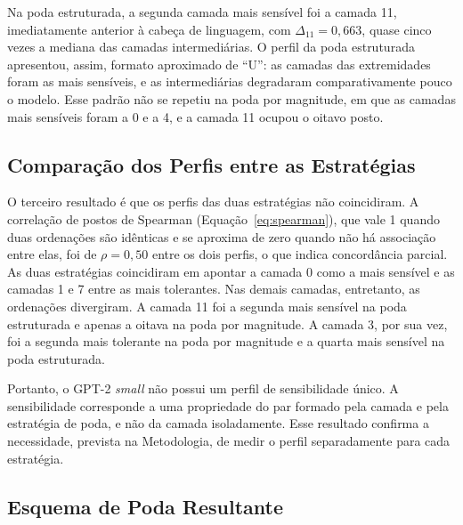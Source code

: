 Na poda estruturada, a segunda camada mais sensível foi a camada 11, imediatamente anterior à
cabeça de linguagem, com $\Delta_{11} = 0{,}663$, quase cinco vezes a mediana das camadas
intermediárias. O perfil da poda estruturada apresentou, assim, formato aproximado de ``U'': as
camadas das extremidades foram as mais sensíveis, e as intermediárias degradaram
comparativamente pouco o modelo. Esse padrão não se repetiu na poda por magnitude, em que as
camadas mais sensíveis foram a 0 e a 4, e a camada 11 ocupou o oitavo posto.

\subsection{Comparação dos Perfis entre as Estratégias}\label{subsec:perfis_divergem}

O terceiro resultado é que os perfis das duas estratégias não coincidiram. A correlação de
postos de Spearman (Equação~\ref{eq:spearman}), que vale 1 quando duas ordenações são
idênticas e se aproxima de zero quando não há associação entre elas, foi de $\rho = 0{,}50$
entre os dois perfis, o que indica concordância parcial. As
duas estratégias coincidiram em apontar a camada 0 como a mais sensível e as camadas 1 e 7
entre as mais tolerantes. Nas demais camadas, entretanto, as ordenações divergiram. A camada 11
foi a segunda mais sensível na poda estruturada e apenas a oitava na poda por magnitude. A
camada 3, por sua vez, foi a segunda mais tolerante na poda por magnitude e a quarta mais
sensível na poda estruturada.

Portanto, o GPT-2 \textit{small} não possui um perfil de sensibilidade único. A sensibilidade
corresponde a uma propriedade do par formado pela camada e pela estratégia de poda, e não da
camada isoladamente. Esse resultado confirma a necessidade, prevista na
Metodologia, de medir o perfil separadamente para cada estratégia.

\subsection{Esquema de Poda Resultante}\label{subsec:alocacao}


